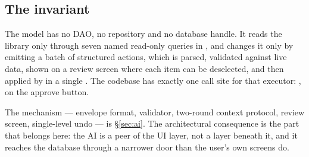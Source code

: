 \subsection{The invariant}

\begin{mochabox}[title={No AI-originated write reaches Room outside \code{ActionExecutor}}]
The model has no DAO, no repository and no database handle. It reads the library only through seven
named read-only queries in , and changes it only by emitting a batch of
structured actions, which is parsed, validated against live data, shown on a review screen where each
item can be deselected, and then applied by  in a single
. The codebase has exactly one call site for that executor:
, on the approve button.
\end{mochabox}

The mechanism --- envelope format, validator, two-round context protocol, review screen, single-level
undo --- is \S\ref{sec:ai}. The architectural consequence is the part that belongs here: the AI is a
peer of the UI layer, not a layer beneath it, and it reaches the database through a narrower door
than the user's own screens do.
